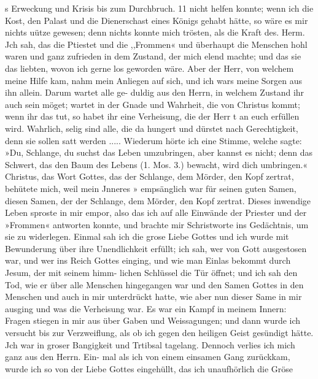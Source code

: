 s Erweckung und Krisis bis zum Durchbruch. 11
nicht helfen konnte; wenn ich die Kost, den Palast und die
Dienerschast eines Königs gehabt hätte, so wäre es mir nichts
uütze gewesen; denn nichts konnte mich trösten, als die Kraft
des. Herm. Jch sah, das die Ptiestet und die ,,Frommen«
und überhaupt die Menschen hohl waren und ganz zufrieden
in dem Zustand, der mich elend machte; und das sie das
liebten, wovon ich gerne los geworden wäre. Aber der Herr,
von welchem meine Hilfe kam, nahm mein Anliegen auf sich, und
ich wars meine Sorgen aus ihn allein. Darum wartet alle ge-
duldig aus den Herrn, in welchem Zustand ihr auch sein möget;
wartet in der Gnade und Wahrheit, die von Christus kommt;
wenn ihr das tut, so habet ihr eine Verheisung, die der Herr t
an euch erfüllen wird. Wahrlich, selig sind alle, die da hungert
und dürstet nach Gerechtigkeit, denn sie sollen satt werden .....
Wiederum hörte ich eine Stimme, welche sagte: »Du, Schlange,
du suchst das Leben umzubringen, aber kannst es nicht; denn das
Schwert, das den Baum des Lebens (1. Mos. 3.) bewacht, wird
dich umbringen.« Christus, das Wort Gottes, das der Schlange,
dem Mörder, den Kopf zertrat, behütete mich, weil mein Jnneres »
empsänglich war für seinen guten Samen, diesen Samen, der der
Schlange, dem Mörder, den Kopf zertrat. Dieses inwendige
Leben sproste in mir empor, also das ich auf alle Einwände der
Priester und der »Frommen« antworten konnte, und brachte mir
Schristworte ins Gedächtnis, um sie zu widerlegen.
Einmal sah ich die grose Liebe Gottes und ich wurde mit
Bewunderung über ihre Unendlichkeit erfüllt; ich sah, wer von
Gott ausgestosen war, und wer ins Reich Gottes einging, und
wie man Einlas bekommt durch Jesum, der mit seinem himm-
lichen Schlüssel die Tür öffnet; und ich sah den Tod, wie er
über alle Menschen hingegangen war und den Samen Gottes in
den Menschen und auch in mir unterdrückt hatte, wie aber nun
dieser Same in mir ausging und was die Verheisung war. Es
war ein Kampf in meinem Innern: Fragen stiegen in mir
aus über Gaben und Weissagungen; und dann wurde ich
versucht bis zur Verzweiflung, als ob ich gegen den heiligen Geist
gesündigt hätte. Jch war in groser Bangigkeit und Trtibsal
tagelang. Dennoch verlies ich mich ganz aus den Herrn. Ein-
mal als ich von einem einsamen Gang zurückkam, wurde ich so
von der Liebe Gottes eingehüllt, das ich unaufhörlich die Gröse


